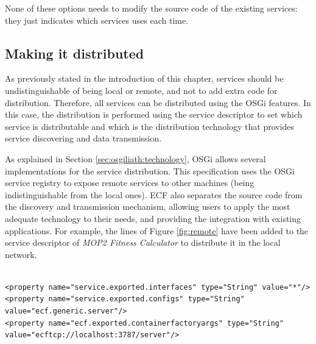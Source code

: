 None of these options needs to modify the source code of the existing
services: they just indicates which services uses each time.

\subsection{Making it distributed}
\label{sec:osgiliath:distributed}

As previously stated in the introduction of this chapter, services should be undistinguishable of being local or remote, and not to add extra code for distribution. Therefore, all services
can be distributed using the OSGi features. In this case, the
distribution is performed using the service descriptor to set which
service is distributable and which is the distribution technology that
provides service discovering and data transmission. 

As explained in Section \ref{sec:osgiliath:technology}, %
 OSGi allows several implementations for the service
 distribution. 
 This specification uses the OSGi service registry to expose remote services to other machines (being indistinguishable from the local ones).  ECF also separates the source code from the discovery and transmission mechanism, allowing users to apply the most adequate technology to their needs, and providing the integration with existing applications. For example, the lines of Figure \ref{fig:remote} have been added to the service descriptor of {\em MOP2 Fitness Calculator} to distribute it in the local network.

 





\newsavebox{\mintedboxServer}
\begin{lrbox}{\mintedboxServer}
\begin{minipage}{10cm}
\begin{verbatim}

<property name="service.exported.interfaces" type="String" value="*"/>
<property name="service.exported.configs" type="String" 
value="ecf.generic.server"/>
<property name="ecf.exported.containerfactoryargs" type="String" 
value="ecftcp://localhost:3787/server"/>
\end{verbatim}
\end{minipage}
\end{lrbox}

